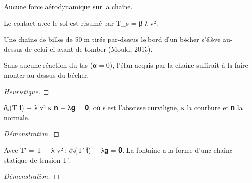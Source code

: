 \begin{choix_modelisation}\label{ch_air}
Aucune force aérodynamique sur la chaîne.
\end{choix_modelisation}

\begin{choix_modelisation}\label{ch_sol}
Le contact avec le sol est résumé par T\_s = β λ v².
\end{choix_modelisation}

\begin{observation}\label{obs_mould}
Une chaîne de billes de 50 m tirée par-dessus le bord d’un bécher s’élève au-dessus de celui-ci avant de tomber (Mould, 2013).
\end{observation}

\begin{conjecture}\label{conj_elan}\abandonne
Sans aucune réaction du tas (α = 0), l’élan acquis par la chaîne suffirait à la faire monter au-dessus du bécher.
\end{conjecture}
\begin{proof}[Heuristique]
\end{proof}

\begin{lemme}\label{l_mouv}
∂ₛ(T 𝐭) − λ v² κ 𝐧 + λ𝐠 = 𝟎, où s est l’abscisse curviligne, κ la courbure et 𝐧 la normale.
\end{lemme}
\begin{proof}[Démonstration]
\end{proof}

\begin{lemme}\label{l_effective}
Avec T′ = T − λ v² : ∂ₛ(T′ 𝐭) + λ𝐠 = 𝟎. La fontaine a la forme d’une chaîne statique de tension T′.
\end{lemme}
\begin{proof}[Démonstration]
\end{proof}

